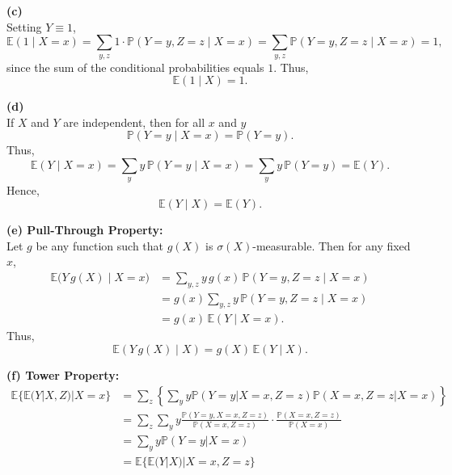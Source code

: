 \documentclass[letterpaper, 11pt]{article}
\newcommand{\1}{\mathds{1}}	%
\theoremstyle{definition}
\begin{document}
    \bigskip
    
    \textbf{(c) }\\[1ex]
    Setting \(Y\equiv 1\),
    \[
    \mathbb{E}(1 \mid X=x)= \sum_{y,z} 1\cdot \mathbb{P}(Y=y, Z=z \mid X=x)
    =\sum_{y,z} \mathbb{P}(Y=y, Z=z \mid X=x)=1,
    \]
    since the sum of the conditional probabilities equals \(1\). Thus,
    \[
    {\mathbb{E}(1 \mid X) = 1.}
    \]
    
    \bigskip
    
    \textbf{(d) }\\[1ex]
    If \(X\) and \(Y\) are independent, then for all \(x\) and \(y\)
    \[
    \mathbb{P}(Y=y \mid X=x)=\mathbb{P}(Y=y).
    \]
    Thus,
    \[
    \mathbb{E}(Y \mid X=x)= \sum_{y} y\, \mathbb{P}(Y=y \mid X=x)
    =\sum_{y} y\, \mathbb{P}(Y=y)= \mathbb{E}(Y).
    \]
    Hence,
    \[
 {\mathbb{E}(Y \mid X) = \mathbb{E}(Y).}
    \]
    
    \bigskip
    
    \textbf{(e) Pull-Through Property:}\\[1ex]
    Let \(g\) be any function such that \(g(X)\) is \(\sigma(X)\)-measurable. Then for any fixed \(x\),
    \[
    \begin{aligned}
    \mathbb{E}\bigl(Y\,g(X) \mid X=x\bigr)
    &=\sum_{y,z} y\,g(x)\,\mathbb{P}(Y=y, Z=z \mid X=x)\\[1ex]
    &= g(x) \sum_{y,z} y\, \mathbb{P}(Y=y, Z=z \mid X=x)\\[1ex]
    &= g(x)\,\mathbb{E}(Y \mid X=x).
    \end{aligned}
    \]
    Thus,
    \[
  {\mathbb{E}(Y\,g(X) \mid X)= g(X)\,\mathbb{E}(Y \mid X).}
    \]
    
    \bigskip
    
    \textbf{(f) Tower Property:}\begin{align*}
        \mathbb{E}\{\mathbb{E}(Y | X, Z) | X = x\} &= \sum_{z} \left\{ \sum_{y} y\mathbb{P}(Y = y | X = x, Z = z)\mathbb{P}(X = x, Z = z | X = x) \right\} \\
        &= \sum_{z}\sum_{y} y\frac{\mathbb{P}(Y = y, X = x, Z = z)}{\mathbb{P}(X = x, Z = z)} \cdot \frac{\mathbb{P}(X = x, Z = z)}{\mathbb{P}(X = x)} \\
        &= \sum_{y} y\mathbb{P}(Y = y | X = x)  \\
        &= \mathbb{E}\{\mathbb{E}(Y | X) | X = x, Z = z\}
        \end{align*}
    
\end{document}
